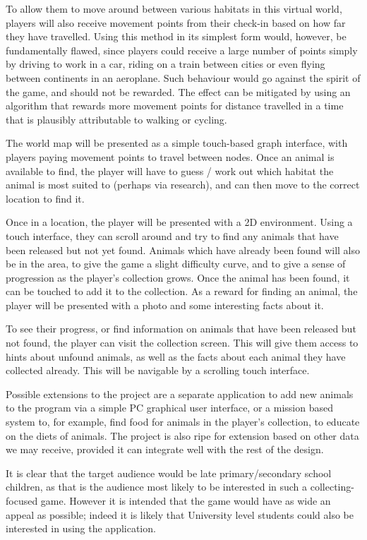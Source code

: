 \documentclass[12pt,a4paper,twoside]{article}
\begin{document}
To allow them to move around between various habitats in this virtual world, players will also receive movement points from their check-in based on how far they have travelled. 
Using this method in its simplest form would, however, be fundamentally flawed, since players could receive a large number of points simply by driving to work in a car, riding on a train between cities or even flying between continents in an aeroplane.
Such behaviour would go against the spirit of the game, and should not be rewarded.
The effect can be mitigated by using an algorithm that rewards more movement points for distance travelled in a time that is plausibly attributable to walking or cycling.

The world map will be presented as a simple touch-based graph interface, with players paying movement points to travel between nodes.
Once an animal is available to find, the player will have to guess / work out which habitat the animal is most suited to (perhaps via research), and can then move to the correct location to find it.

Once in a location, the player will be presented with a 2D environment.
Using a touch interface, they can scroll around and try to find any animals that have been released but not yet found.
Animals which have already been found will also be in the area, to give the game a slight difficulty curve, and to give a sense of progression as the player's collection grows.
Once the animal has been found, it can be touched to add it to the collection.
As a reward for finding an animal, the player will be presented with a photo and some interesting facts about it.

To see their progress, or find information on animals that have been released but not found, the player can visit the collection screen.
This will give them access to hints about unfound animals, as well as the facts about each animal they have collected already.
This will be navigable by a scrolling touch interface.

Possible extensions to the project are a separate application to add new animals to the program via a simple PC graphical user interface, or a mission based system to, for example, find food for animals in the player's collection, to educate on the diets of animals.
The project is also ripe for extension based on other data we may receive, provided it can integrate well with the rest of the design.

It is clear that the target audience would be late primary/secondary school children, as that is the audience most likely to be interested in such a collecting-focused game.
However it is intended that the game would have as wide an appeal as possible; indeed it is likely that University level students could also be interested in using the application.
\end{document}
